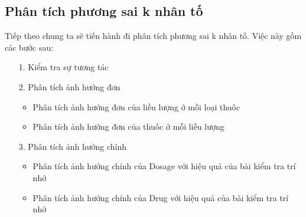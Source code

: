 \subsection{Phân tích phương sai k nhân tố}
Tiếp theo chung ta sẽ tiến hành đi phân tích phương sai k nhân tố. Việc này gồm các bước sau:
\begin{itemize}
    \item [1.] Kiểm tra sự tương tác
    \item [2.] Phân tích ảnh hưởng đơn
    \begin{itemize}
        \item Phân tích ảnh hưởng đơn của liều lượng ở mỗi loại thuốc
        \item Phân tích ảnh hưởng đơn của thuốc ở mỗi liều lượng
    \end{itemize}
    \item [3.] Phân tích ảnh hưởng chính
    \begin{itemize}
        \item Phân tích ảnh hưởng chính của Dosage với hiệu quả của bài kiểm tra trí nhớ
        \item Phân tích ảnh hưởng chính của Drug với hiệu quả của bài kiểm tra trí nhớ
    \end{itemize}
\end{itemize}


